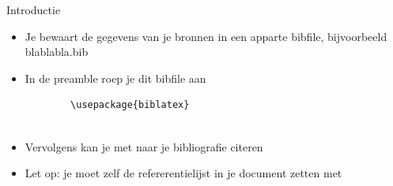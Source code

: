 \begin{frame}[fragile]{Introductie}
\begin{itemize}[label=\textbullet]
    \item Je bewaart de gegevens van je bronnen in een apparte bibfile, bijvoorbeeld blablabla.bib \pause
    \item In de preamble roep je dit bibfile aan
    \begin{verbatim}
		\usepackage{biblatex}
		
	\end{verbatim} 
    \pause
    \item Vervolgens kan je met \texttt{\cite{source}} naar je bibliografie citeren 
    \pause
    \item Let op: je moet zelf de refererentielijst in je document zetten met \texttt{\printbibliografy}
\end{itemize}
\end{frame}